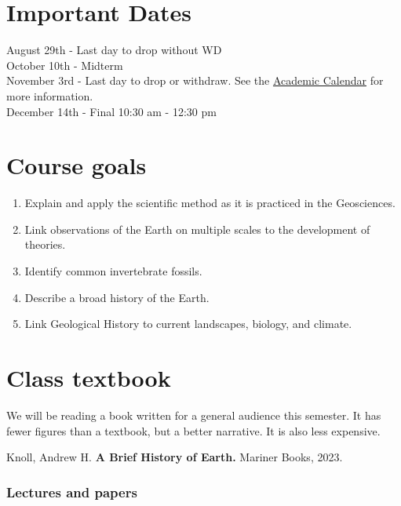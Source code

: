 \documentclass[11pt,]{article}
\providecommand{\tightlist}{%
  \setlength{\itemsep}{0pt}\setlength{\parskip}{0pt}}
\begin{document}
\hypertarget{important-dates}{%
\section{Important Dates}\label{important-dates}}

August 29th - Last day to drop without WD\\
October 10th - Midterm\\
November 3rd - Last day to drop or withdraw. See the
\href{https://www.southalabama.edu/academiccalendar/}{Academic Calendar}
for more information.\\
December 14th - Final 10:30 am - 12:30 pm\\

\hypertarget{course-goals}{%
\section{Course goals}\label{course-goals}}

\begin{enumerate}
\def\labelenumi{\arabic{enumi}.}
\tightlist
\item
  Explain and apply the scientific method as it is practiced in the
  Geosciences.
\item
  Link observations of the Earth on multiple scales to the development
  of theories.
\item
  Identify common invertebrate fossils.
\item
  Describe a broad history of the Earth.
\item
  Link Geological History to current landscapes, biology, and climate.
\end{enumerate}

\hypertarget{class-textbook}{%
\section{Class textbook}\label{class-textbook}}

We will be reading a book written for a general audience this semester.
It has fewer figures than a textbook, but a better narrative. It is also
less expensive.

Knoll, Andrew H. \textbf{A Brief History of Earth.} Mariner Books, 2023.

\hypertarget{lectures-and-papers}{%
\subsubsection{Lectures and papers}\label{lectures-and-papers}}
\end{document}
